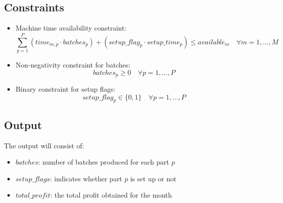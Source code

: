 \documentclass{article}
\begin{document}
\subsection*{Constraints}
\begin{itemize}
    \item Machine time availability constraint:
    \[
    \sum_{p=1}^{P} (time_{m,p} \cdot batches_{p}) + (setup\_flag_{p} \cdot setup\_time_{p}) \leq available_{m} \quad \forall m = 1, \ldots, M
    \]

    \item Non-negativity constraint for batches:
    \[
    batches_{p} \geq 0 \quad \forall p = 1, \ldots, P
    \]

    \item Binary constraint for setup flags:
    \[
    setup\_flag_{p} \in \{0, 1\} \quad \forall p = 1, \ldots, P
    \]
\end{itemize}

\subsection*{Output}
The output will consist of:
\begin{itemize}
    \item $batches$: number of batches produced for each part $p$
    \item $setup\_flags$: indicates whether part $p$ is set up or not
    \item $total\_profit$: the total profit obtained for the month
\end{itemize}
\end{document}
